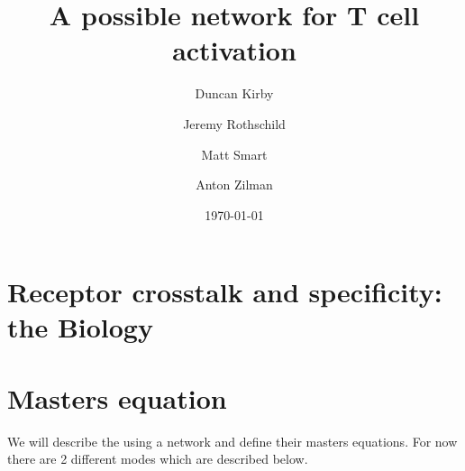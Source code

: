 \documentclass[aip, jmp, amsmath,amssymb, preprint, reprint, author-year,%
]{revtex4-1}
\begin{document}

\title[T Cell Activation]{A possible network for T cell activation}%
\author{Duncan Kirby}
\author{Jeremy Rothschild}
\author{Matt Smart}
\author{Anton Zilman}%


\date{\today}%


\maketitle



\section{\label{sec:bio}Receptor crosstalk and specificity: the Biology}


\section{\label{sec:model}Masters equation}

We will describe the using a network and define their masters equations. For now there are 2 different modes which are described below.






%
\end{document}
